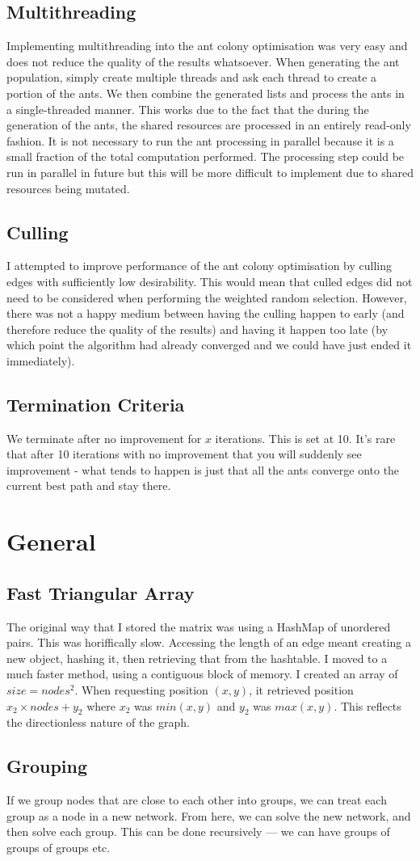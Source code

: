 \documentclass[a4paper, 11pt,table]{article}
\begin{document}
\subsection{Multithreading}
Implementing multithreading into the ant colony optimisation was very easy and does not reduce the quality of the results whatsoever. When generating the ant population, simply create multiple threads and ask each thread to create a portion of the ants. We then combine the generated lists and process the ants in a single-threaded manner. This works due to the fact that the during the generation of the ants, the shared resources are processed in an entirely read-only fashion. It is not necessary to run the ant processing in parallel because it is a small fraction of the total computation performed. The processing step could be run in parallel in future but this will be more difficult to implement due to shared resources being mutated.

\subsection{Culling}
I attempted to improve performance of the ant colony optimisation by culling edges with sufficiently low desirability. This would mean that culled edges did not need to be considered when performing the weighted random selection. However, there was not a happy medium between having the culling happen to early (and therefore reduce the quality of the results) and having it happen too late (by which point the algorithm had already converged and we could have just ended it immediately).

\subsection{Termination Criteria}
We terminate after no improvement for $x$ iterations. This is set at 10. It's rare that after 10 iterations with no improvement that you will suddenly see improvement - what tends to happen is just that all the ants converge onto the current best path and stay there.

\section{General}
\subsection{Fast Triangular Array}
The original way that I stored the matrix was using a HashMap of unordered pairs. This was horiffically slow. Accessing the length of an edge meant creating a new object, hashing it, then retrieving that from the hashtable. I moved to a much faster method, using a contiguous block of memory. I created an array of $size=nodes^2$. When requesting position $(x,y)$, it retrieved position $x_2 \times nodes + y_2$ where $x_2$ was $min(x,y)$ and $y_2$ was $max(x,y)$. This reflects the directionless nature of the graph.

\subsection{Grouping}
If we group nodes that are close to each other into groups, we can treat each group as a node in a new network. From here, we can solve the new network, and then solve each group. This can be done recursively --- we can have groups of groups of groups etc.
	
\end{document}
